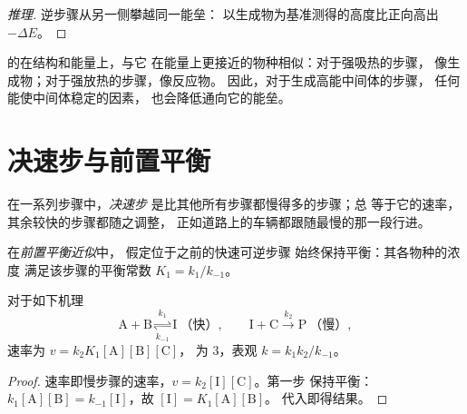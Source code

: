 \begin{proof}[推理]
逆步骤从另一侧攀越同一能垒：
以生成物为基准测得的高度比正向高出 $-\Delta E$。
\end{proof}

\begin{proposition}[哈蒙德假设]\label{prop:b1:elementary-steps:hammond}
的在结构和能量上，与它
在能量上更接近的物种相似：对于强吸热的步骤，
像生成物；对于强放热的步骤，像反应物。
因此，对于生成高能中间体的步骤，
任何能使中间体稳定的因素，
也会降低通向它的能垒。
\end{proposition}
\admitted

\section{决速步与前置平衡}

\begin{definition}[决速步]\label{def:b1:elementary-steps:rds}
在一系列步骤中，\emph{决速步}
是比其他所有步骤都慢得多的步骤；总
等于它的速率，其余较快的步骤都随之调整，
正如道路上的车辆都跟随最慢的那一段行进。
\end{definition}

\begin{definition}[前置平衡近似]\label{def:b1:elementary-steps:pre-equilibrium}
在\emph{前置平衡近似}中，
假定位于之前的快速可逆步骤
始终保持平衡：其各物种的浓度
满足该步骤的平衡常数 $K_1 = k_1/k_{-1}$。
\end{definition}

\begin{proposition}[由前置平衡导出的速率方程]\label{prop:b1:elementary-steps:pre-equilibrium-law}
对于如下机理
\[
  \mathrm{A} + \mathrm{B} \underset{k_{-1}}{\overset{k_1}{\rightleftharpoons}} \mathrm{I}
  \ \text{（快）}, \qquad
  \mathrm{I} + \mathrm{C} \xrightarrow{\ k_2\ } \mathrm{P} \ \text{（慢）},
\]
速率为 $v = k_2K_1[\mathrm{A}][\mathrm{B}][\mathrm{C}]$，
为 3，表观 $k = k_1k_2/k_{-1}$。
\end{proposition}

\begin{proof}
速率即慢步骤的速率，$v = k_2[\mathrm{I}][\mathrm{C}]$。第一步
保持平衡：$k_1[\mathrm{A}][\mathrm{B}] =
k_{-1}[\mathrm{I}]$，故 $[\mathrm{I}] = K_1[\mathrm{A}][\mathrm{B}]$。
代入即得结果。
\end{proof}

